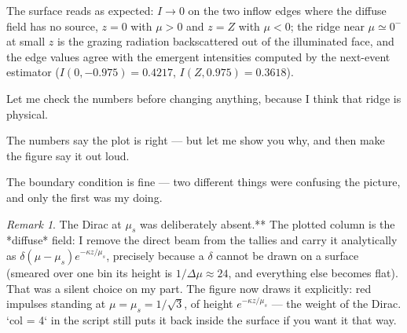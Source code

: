 \documentclass[11pt,a4paper]{article}
\theoremstyle{remark}
\newtheorem{remark}{Remark}
\begin{document}
The surface reads as expected: $I\to0$ on the two inflow edges where the diffuse field has no source, $z=0$ with $\mu>0$ and $z=Z$ with $\mu<0$; the ridge near $\mu\simeq0^-$ at small $z$ is the grazing radiation backscattered out of the illuminated face, and the edge values agree with the emergent intensities computed by the next-event estimator ($I(0,-0.975)=0.4217$, $I(Z,0.975)=0.3618$).


Let me check the numbers before changing anything, because I think that ridge is physical.

The numbers say the plot is right — but let me show you why, and then make the figure say it out loud.

The boundary condition is fine — two different things were confusing the picture, and only the first was my doing.

\begin{remark}
The Dirac at $\mu_s$ was deliberately absent.** The plotted column is the *diffuse* field: I remove the direct beam from the tallies and carry it analytically as $\delta(\mu-\mu_s)e^{-\kappa z/\mu_s}$, precisely because a $\delta$ cannot be drawn on a surface (smeared over one bin its height is $1/\Delta\mu\approx24$, and everything else becomes flat). That was a silent choice on my part. The figure now draws it explicitly: red impulses standing at $\mu=\mu_s=1/\sqrt3$, of height $e^{-\kappa z/\mu_s}$ — the weight of the Dirac. `col = 4` in the script still puts it back inside the surface if you want it that way.
\end{remark}
\end{document}
